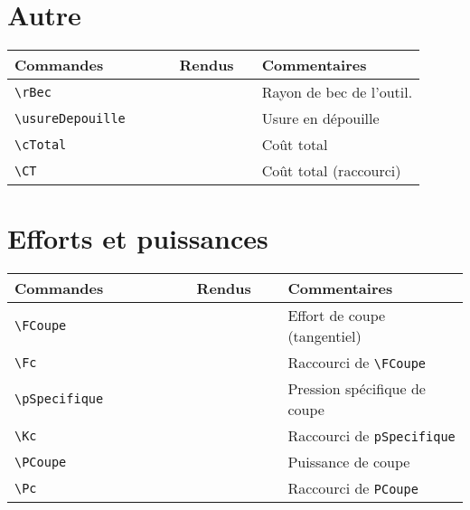 \documentclass[a4paper,12pt]{article}
\begin{document}
	\section{Autre}
		\noindent
		\begin{tabular}{|p{0.4\linewidth}|p{0.2\linewidth}|p{0.4\linewidth}|}
			\hline
				\textbf{Commandes}&\textbf{Rendus}&\textbf{Commentaires}
			\\\hline\hline
				\verb!\rBec!		&	\rBec		&	Rayon de bec de l'outil.
			\\\hline
				\verb!\usureDepouille!	&	\usureDepouille	&	Usure en dépouille
			\\\hline
				\verb!\cTotal!	&	\usureDepouille	&	Coût total
			\\\hline
				\verb!\CT!	&	\usureDepouille	&	Coût total (raccourci)
			\\\hline
		\end{tabular}

	\section{Efforts et puissances}
		\noindent
		\begin{tabular}{|p{0.4\linewidth}|p{0.2\linewidth}|p{0.4\linewidth}|}
			\hline
				\textbf{Commandes}&\textbf{Rendus}&\textbf{Commentaires}
			\\\hline\hline
				\verb!\FCoupe!		&	\FCoupe		&	Effort de coupe (tangentiel)
			\\\hline
				\verb!\Fc!		&	\Fc		&	Raccourci de \verb!\FCoupe!
			\\\hline
				\verb!\pSpecifique!	&	\pSpecifique	&	Pression spécifique de coupe
			\\\hline
				\verb!\Kc!		&	\Kc		&	Raccourci de \verb!pSpecifique!
			\\\hline
				\verb!\PCoupe!		&	\PCoupe		&	Puissance de coupe
			\\\hline
				\verb!\Pc!		&	\Pc		&	Raccourci de \verb!PCoupe!
			\\\hline
		\end{tabular}
\end{document}
